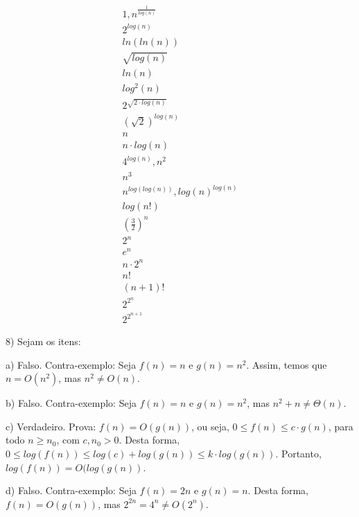 \documentclass[]{article}
\begin{document}
\begin{align*}
    1, n^{\frac{1}{log(n)}} \\
    2^{log(n)} \\
    ln(ln(n)) \\
    \sqrt{log(n)} \\
    ln(n) \\
    log^2(n) \\
    2^{\sqrt{2 \cdot log(n)}} \\
    (\sqrt{2})^{log(n)} \\
    n \\
    n \cdot log(n) \\
    4^{log(n)}, n^2 \\
    n^3 \\
    n^{log(log(n))}, log(n)^{log(n)} \\
    log(n!) \\
    (\frac{3}{2})^n \\
    2^n \\
    e^n \\
    n \cdot 2^n \\
    n! \\
    (n+1)! \\
    2^{2^n} \\
    2^{2^{n+1}}
\end{align*}

\newpage

8) Sejam os itens:

a) Falso. Contra-exemplo: Seja $f(n)=n$ e $g(n)=n^2$. Assim, temos que $n = O(n^2)$, mas $n^2 \neq O(n)$.

\vspace{0.5cm}

b) Falso. Contra-exemplo: Seja $f(n)=n$ e $g(n)=n^2$, mas $n^2 + n \neq \Theta(n)$.

\vspace{0.5cm}

c) Verdadeiro. Prova: $f(n) = O(g(n))$, ou seja, $0 \leq f(n) \leq c \cdot g(n)$, para todo $n \geq n_0$, com $c, n_0 > 0$. Desta forma, $0 \leq log(f(n)) \leq log(c) + log(g(n)) \leq k \cdot log(g(n))$. Portanto, $log(f(n)) = O(log(g(n))$.

\vspace{0.5cm}

d) Falso. Contra-exemplo: Seja $f(n)=2n$ e $g(n)=n$. Desta forma, $f(n) = O(g(n))$, mas $2^{2n} = 4^n \neq O(2^n)$.

\vspace{1cm}
\end{document}
